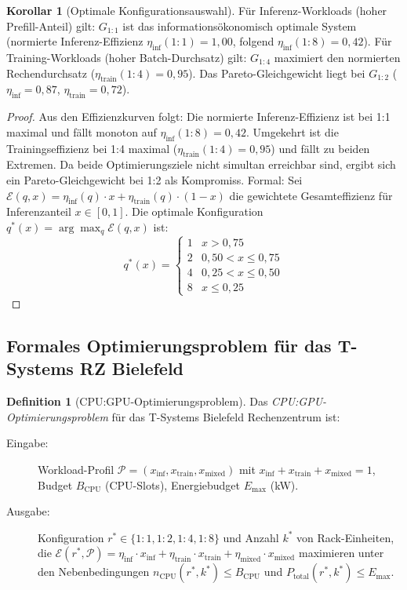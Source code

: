 ﻿\documentclass[a4paper,12pt]{article}
\theoremstyle{definition}
\newtheorem{definition}{Definition}
\newtheorem{korollar}{Korollar}
\begin{document}
\begin{korollar}[Optimale Konfigurationsauswahl]
  \label{kor:optimal}
  F\"{u}r Inferenz-Workloads (hoher Prefill-Anteil) gilt: $G_{1:1}$ ist das informations\"{o}konomisch optimale System (normierte Inferenz-Effizienz $\eta_{\text{inf}}(1:1) = 1{,}00$, folgend $\eta_{\text{inf}}(1:8) = 0{,}42$).
  F\"{u}r Training-Workloads (hoher Batch-Durchsatz) gilt: $G_{1:4}$ maximiert den normierten Rechendurchsatz ($\eta_{\text{train}}(1:4) = 0{,}95$).
  Das Pareto-Gleichgewicht liegt bei $G_{1:2}$ ($\eta_{\text{inf}} = 0{,}87$, $\eta_{\text{train}} = 0{,}72$).
\end{korollar}

\begin{proof}
  Aus den Effizienzkurven folgt: Die normierte Inferenz-Effizienz ist bei 1:1 maximal und f\"{a}llt monoton auf $\eta_{\text{inf}}(1:8) = 0{,}42$.
  Umgekehrt ist die Trainingseffizienz bei 1:4 maximal ($\eta_{\text{train}}(1:4) = 0{,}95$) und f\"{a}llt zu beiden Extremen.
  Da beide Optimierungsziele nicht simultan erreichbar sind, ergibt sich ein Pareto-Gleichgewicht bei 1:2 als Kompromiss.
  Formal: Sei $\mathcal{E}(q, x) = \eta_{\text{inf}}(q) \cdot x + \eta_{\text{train}}(q) \cdot (1-x)$ die gewichtete Gesamteffizienz f\"{u}r Inferenzanteil $x \in [0,1]$.
  Die optimale Konfiguration $q^*(x) = \arg\max_q \mathcal{E}(q, x)$ ist:
  \[
    q^*(x) = \begin{cases}
      1 & x > 0{,}75 \\
      2 & 0{,}50 < x \leq 0{,}75 \\
      4 & 0{,}25 < x \leq 0{,}50 \\
      8 & x \leq 0{,}25
    \end{cases}
  \]
\end{proof}

\subsection{Formales Optimierungsproblem f\"{u}r das T-Systems RZ Bielefeld}

\begin{definition}[CPU:GPU-Optimierungsproblem]
  \label{def:cpugpu_opt}
  Das \emph{CPU:GPU-Optimierungsproblem} f\"{u}r das T-Systems Bielefeld Rechenzentrum ist:
  \begin{description}
    \item[Eingabe:] Workload-Profil $\mathcal{P} = (x_{\text{inf}}, x_{\text{train}}, x_{\text{mixed}})$ mit $x_{\text{inf}} + x_{\text{train}} + x_{\text{mixed}} = 1$, Budget $B_{\text{CPU}}$ (CPU-Slots), Energiebudget $E_{\text{max}}$ (kW).
    \item[Ausgabe:] Konfiguration $r^* \in \{1:1, 1:2, 1:4, 1:8\}$ und Anzahl $k^*$ von Rack-Einheiten, die
          $\mathcal{E}(r^*, \mathcal{P}) = \eta_{\text{inf}} \cdot x_{\text{inf}} + \eta_{\text{train}} \cdot x_{\text{train}} + \eta_{\text{mixed}} \cdot x_{\text{mixed}}$ maximieren
          unter den Nebenbedingungen $n_{\text{CPU}}(r^*, k^*) \leq B_{\text{CPU}}$ und $P_{\text{total}}(r^*, k^*) \leq E_{\text{max}}$.
  \end{description}
\end{definition}
\end{document}
